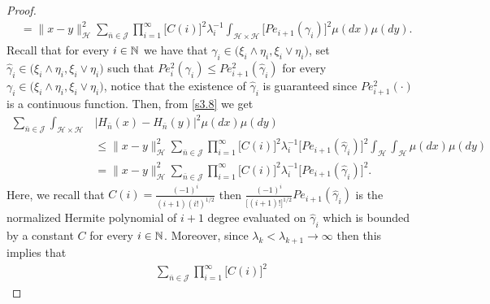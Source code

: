 \documentclass[review, onefignum, onetabnum]{siamart171218}
\begin{document}
\begin{proof}
\begin{equation}
\begin{aligned}
        &=
        \| x-y\|_{\mathcal{H}}^2
        \sum_{\bar n\in \mathcal{J}}
            \prod_{i=1}^\infty
                \Big[
                    C(i)
                \Big]^2
                \lambda_i^{-1}
                \int_{\mathcal{H}\times \mathcal{H}}
                    \Big[
                        Pe_{i+1}(\gamma_i)
                    \Big]^2
                \mu(dx)\mu(dy) .
    \end{aligned}
\end{equation}
Recall that for every $i \in {\mathbb N}$ we have that $\gamma_i\in
\big(\xi_i\wedge\eta_i, \xi_i\vee \eta_i  \big)$, set $\hat \gamma_i
\in \big(\xi_i\wedge\eta_i, \xi_i\vee \eta_i  \big)$ such that
$Pe_i^2(\gamma_i)\le Pe_{i+1}^2(\hat\gamma_i)$ for every
$\gamma_i\in \big(\xi_i\wedge\eta_i, \xi_i\vee \eta_i  \big)$, notice that the
existence of $\hat \gamma_i$ is
guaranteed since $ Pe_{i+1}^2(\cdot)$ is a continuous function. Then, from
\eqref{s3.8} we get
\begin{equation}
    \label{s3.9}
    \begin{aligned}
        \sum_{\bar n\in \mathcal{J}}
        \int_{\mathcal{H}\times \mathcal{H}}
        &
        \big|
            H_{\bar n}(x) - H_{\bar n}(y)
        \big|^2
        \mu(dx)\mu(dy)
        \\
        &\le
        \| x-y\|_{\mathcal{H}}^2
        \sum_{\bar n\in \mathcal{J}}
            \prod_{i=1}^\infty
            \Big[
                C(i)
            \Big]^2
            \lambda_i^{-1}
            \Big[
                Pe_{i+1}(\hat \gamma_i)
            \Big]^2
            \int_{\mathcal{H}}
            \int_{\mathcal{H}}
            \mu(dx)\mu(dy)
        \\
        &=
        \| x-y\|_{\mathcal{H}}^2
        \sum_{\bar n\in \mathcal{J}}
            \prod_{i=1}^\infty
            \Big[
                C(i)
            \Big]^2
            \lambda_i^{-1}
            \Big[
                Pe_{i+1}(\hat \gamma_i)
            \Big]^2 .
    \end{aligned}
\end{equation}
Here, we recall that $C(i)=\frac{(-1)^i}{(i+1)(i!)^{1/2}} $ then
$\frac{(-1)^i}{\big[(i+1)!\Big]^{1/2}} Pe_{i+1}(\hat \gamma_i)$
is the normalized Hermite polynomial of $i+1$ degree evaluated on
$\hat \gamma_i$ which is bounded by a constant $C$ for every $i\in{\mathbb N}$.
Moreover, since $\lambda_k<\lambda_{k+1}\rightarrow \infty $
then this implies that
\begin{align}
    \label{s3.10}
  \sum_{\bar n\in \mathcal{J}}  \prod_{i=1}^\infty \Big[C(i)\Big]^2

\end{align}
\end{proof}
\end{document}
